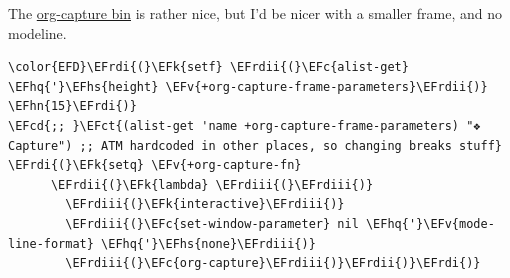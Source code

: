 \documentclass{scrartcl}
\newcommand{\EFk}[1]{\textcolor{EFk}{#1}} %
\newcommand{\EFct}[1]{\textcolor{EFct}{#1}} %
\newcommand{\EFc}[1]{\textcolor{EFc}{#1}} %
\newcommand{\EFv}[1]{\textcolor{EFv}{#1}} %
\newcommand{\EFcd}[1]{\textcolor{EFcd}{#1}} %
\newcommand{\EFhn}[1]{\textcolor{EFhn}{\textbf{#1}}} %
\newcommand{\EFhq}[1]{\textcolor{EFhq}{#1}} %
\newcommand{\EFhs}[1]{\textcolor{EFhs}{#1}} %
\newcommand{\EFrdi}[1]{\textcolor{EFrdi}{#1}} %
\newcommand{\EFrdii}[1]{\textcolor{EFrdii}{#1}} %
\newcommand{\EFrdiii}[1]{\textcolor{EFrdiii}{#1}} %
\begin{document}
The \href{file:///home/shaunsingh0207/.emacs.doom/bin/org-capture}{org-capture bin} is rather nice, but I'd be nicer with a smaller frame, and
no modeline.

\begin{Code}
\begin{Verbatim}[]
\color{EFD}\EFrdi{(}\EFk{setf} \EFrdii{(}\EFc{alist-get} \EFhq{'}\EFhs{height} \EFv{+org-capture-frame-parameters}\EFrdii{)} \EFhn{15}\EFrdi{)}
\EFcd{;; }\EFct{(alist-get 'name +org-capture-frame-parameters) "❖ Capture") ;; ATM hardcoded in other places, so changing breaks stuff}
\EFrdi{(}\EFk{setq} \EFv{+org-capture-fn}
      \EFrdii{(}\EFk{lambda} \EFrdiii{(}\EFrdiii{)}
        \EFrdiii{(}\EFk{interactive}\EFrdiii{)}
        \EFrdiii{(}\EFc{set-window-parameter} nil \EFhq{'}\EFv{mode-line-format} \EFhq{'}\EFhs{none}\EFrdiii{)}
        \EFrdiii{(}\EFc{org-capture}\EFrdiii{)}\EFrdii{)}\EFrdi{)}
\end{Verbatim}
\end{Code}
\end{document}

